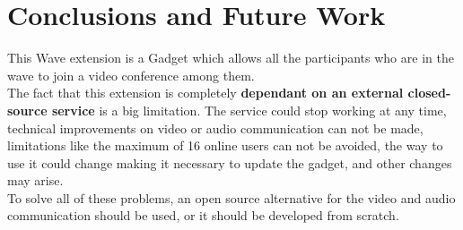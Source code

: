 \section{Conclusions and Future Work}
This Wave extension is a Gadget which allows all the participants who are in the wave to join a video conference among them.\\[.2cm]
The fact that this extension is completely \textbf{dependant on an external closed-source service} is a big limitation. The service could stop working at any time, technical improvements on video or audio communication can not be made, limitations like the maximum of 16 online users can not be avoided, the way to use it could change making it necessary to update the gadget, and other changes may arise.\\[.2cm]
To solve all of these problems, an open source alternative for the video and audio communication should be used, or it should be developed from scratch.
\newpage
